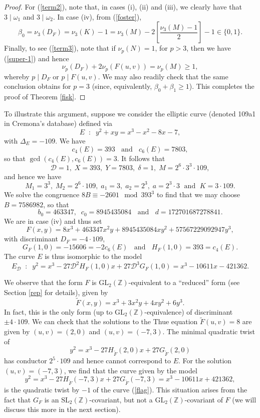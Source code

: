\begin{proof}
For (\ref{term2}), note that, in cases (i), (ii) and (iii), we clearly have that  $3 \mid \omega_1$ and $3 \mid \omega_2$.  In case (iv), from (\ref{foster}),
$$
\beta_0 = \nu_3 (D_F) = \nu_3(K) -1 = \nu_3(M) - 2  \left[ \frac{\nu_3(M)-1}{2} \right] - 1 \in \{ 0, 1 \}.
$$
Finally, to see (\ref{term3}), note that if $\nu_p(N)=1$, for  $p > 3$, then we have (\ref{super-1}) and hence
$$
\nu_p(D_F) + 2 \nu_p (F(u,v)) = \nu_p(M) \geq 1,
$$
whereby $p \mid D_F$ or $p \mid F(u,v)$.
We may also readily check that the same conclusion obtains for $p=3$ (since, equivalently, $\beta_0+\beta_1 \geq 1$). This completes the proof of Theorem \ref{fisk}.


\end{proof}

To illustrate this argument, suppose we consider the elliptic curve (denoted 109a1 in Cremona's database) defined via
$$
E \; \; : \; \; y^2 + xy = x^3 - x^2 -8 x -7,
$$
with $\Delta_E=-109$.
We have
$$
c_4(E) = 393 \; \; \mbox{ and } \; \; c_6(E)=7803,
$$
so that $\gcd (c_4(E), c_6(E))=3$. It follows that
$$
\mathcal{D} = 1, \; X=393, \; Y=7803, \; \delta=1, \; M = 2^6 \cdot 3^3 \cdot 109,
$$
and hence we have
$$
M_1 = 3^3, \; M_2=2^6 \cdot 109, \; a_1 = 3, \; a_2 = 2^3, \; a=2^3 \cdot 3 \; \mbox{ and } \; K = 3 \cdot 109.
$$
We solve the congruence $8B \equiv -2601 \mod{393^3}$ to find that we may choose $B=7586982$, so that
$$
b_0 =463347, \; \; 
c_0 = 8945435084 \; \; \mbox{ and } \; \; 
d =172701687278841.
$$
We are in case (iv) and thus set
$$
F(x,y) = 8 x^3 + 463347 x^2 y + 8945435084 x y^2 + 57567229092947 y^3,
$$
with discriminant $D_F = -4 \cdot 109$,
$$
G_F(1,0) = -15606 = -2 c_6(E) \; \; \mbox{ and } \; \; H_F(1,0)=393 = c_4(E).
$$
The curve $E$ is thus isomorphic to the model
\begin{equation} \label{flag}
E_{\mathcal{D}} \; \; : \; \; y^2 = x^3 - 27 \mathcal{D}^2 H_{F}(1,0) x + 27 \mathcal{D}^3 G_{F}(1,0) = x^3 - 10611x-421362.
\end{equation}

We observe that the form $F$ is $\mbox{GL}_2(\mathbb{Z})$-equivalent to a ``reduced'' form (see Section \ref{rep} for details),  given by
$$
\tilde{F} (x,y) = x^3 + 3 x^2y + 4 x y^2 + 6 y^3.
$$
In fact, this is the only form (up to $\mbox{GL}_2(\mathbb{Z})$-equivalence) of discriminant $\pm 4 \cdot 109$. We can check that the solutions to the Thue equation
$\tilde{F}(u,v)=8$ are given by $(u,v)=(2,0)$ and $(u,v)=(-7,3)$. 
The minimal quadratic twist of 
$$
y^2 = x^3 -27 H_{\tilde{F}}(2,0) x +27 G_{\tilde{F}}(2,0)
$$
has conductor $2^5 \cdot 109$ and hence cannot correspond to $E$. For the solution $(u,v)=(-7,3)$, we find that the curve given by the model
$$
y^2 = x^3 -27 H_{\tilde{F}}(-7,3) x +27 G_{\tilde{F}}(-7,3) =x^3 - 10611x+421362,
$$
is the quadratic twist by $-1$ of the curve (\ref{flag}). This situation arises from the fact that $G_F$ is an $\mbox{SL}_2(\mathbb{Z})$-covariant, but not a $\mbox{GL}_2(\mathbb{Z})$-covariant of $F$ (we will discuss this more in the next section).

